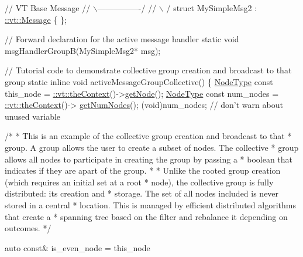 \begin{DoxyCodeInclude}
\textcolor{comment}{//                  VT Base Message}
\textcolor{comment}{//                 \(\backslash\)----------------/}
\textcolor{comment}{//                  \(\backslash\)              /}
\textcolor{keyword}{struct }MySimpleMsg2 : \hyperlink{structvt_1_1messaging_1_1_active_msg}{::vt::Message} \{ \};

\textcolor{comment}{// Forward declaration for the active message handler}
\textcolor{keyword}{static} \textcolor{keywordtype}{void} msgHandlerGroupB(MySimpleMsg2* msg);

\textcolor{comment}{// Tutorial code to demonstrate collective group creation and broadcast to that group}
\textcolor{keyword}{static} \textcolor{keyword}{inline} \textcolor{keywordtype}{void} activeMessageGroupCollective() \{
  \hyperlink{namespacevt_a866da9d0efc19c0a1ce79e9e492f47e2}{NodeType} \textcolor{keyword}{const} this\_node = \hyperlink{namespacevt_a26551fe0e6e6a1371111df5b12c7e92c}{::vt::theContext}()->\hyperlink{structvt_1_1ctx_1_1_context_a0d52c263ce8516546a67443d9a86fa5f}{getNode}();
  \hyperlink{namespacevt_a866da9d0efc19c0a1ce79e9e492f47e2}{NodeType} \textcolor{keyword}{const} num\_nodes = \hyperlink{namespacevt_a26551fe0e6e6a1371111df5b12c7e92c}{::vt::theContext}()->
      \hyperlink{structvt_1_1ctx_1_1_context_a7f41071aadf6d5fa9e1b6c703c5ff19d}{getNumNodes}();
  (void)num\_nodes;  \textcolor{comment}{// don't warn about unused variable}

  \textcolor{comment}{/*}
\textcolor{comment}{   * This is an example of the collective group creation and broadcast to that}
\textcolor{comment}{   * group. A group allows the user to create a subset of nodes. The collective}
\textcolor{comment}{   * group allows all nodes to participate in creating the group by passing a}
\textcolor{comment}{   * boolean that indicates if they are apart of the group.}
\textcolor{comment}{   *}
\textcolor{comment}{   * Unlike the rooted group creation (which requires an initial set at a root}
\textcolor{comment}{   * node), the collective group is fully distributed: its creation and}
\textcolor{comment}{   * storage. The set of all nodes included is never stored in a central}
\textcolor{comment}{   * location. This is managed by efficient distributed algorithms that create a}
\textcolor{comment}{   * spanning tree based on the filter and rebalance it depending on outcomes.}
\textcolor{comment}{   */}

  \textcolor{keyword}{auto} \textcolor{keyword}{const}& is\_even\_node = this\_node %


\end{DoxyCodeInclude}

